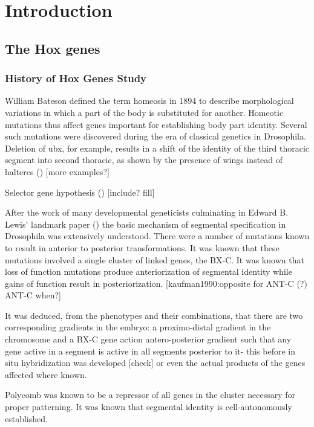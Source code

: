 \chapter{Introduction}


\label{chp:intro}

\section{The Hox genes}

\subsection{History of Hox Genes Study}

William Bateson defined the term homeosis in 1894 to describe morphological variations in which a part of the body is substituted for another. Homeotic mutations thus affect genes important for establishing body part identity. Several such mutations were discovered during the era of classical genetics in Drosophila. Deletion of \ac{ubx}, for example, results in a shift of the identity of the third thoracic segment into second thoracic, as shown by the presence of wings instead of halteres (\cite{ref}) [more examples?]

Selector gene hypothesis (\cite{Garcia-Bellido1975,Garcia-Bellido1977}) [include? fill]

After the work of many developmental geneticists culminating in Edward B. Lewis' landmark paper (\cite{Lewis1978}) the basic mechanism of segmental specification in Drosophila was extensively understood. There were a number of mutations known to result in anterior to posterior transformations. It was known that these mutations involved a single cluster of linked genes, the \ac{BX-C}. It was known that loss of function mutations produce anteriorization of segmental identity while gains of function result in posteriorization. [kaufman1990:opposite for \ac{ANT-C} (?) \ac{ANT-C} when?]

It was deduced, from the phenotypes and their combinations, that there are two corresponding gradients in the embryo: a proximo-distal gradient in the chromosome and a \ac{BX-C} gene action antero-posterior gradient such that any gene active in a segment is active in all segments posterior to it- this before in situ hybridization was developed [check] or even the actual products of the genes affected where known.

Polycomb was known to be a repressor of all genes in the cluster necessary for proper patterning. It was known that segmental identity is cell-autonomously established. 

